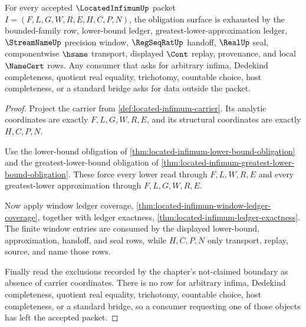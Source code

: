 \begin{theorem}
\label{thm:located-infimum-obligation-boundary}
For every accepted $\LocatedInfimumUp$ packet $I=(F,L,G,W,R,E,H,C,P,N)$, the obligation surface is exhausted by the bounded-family row, lower-bound ledger, greatest-lower-approximation ledger, $\StreamNameUp$ precision window, $\RegSeqRatUp$ handoff, $\RealUp$ seal, componentwise $\hsame$ transport, displayed $\Cont$ replay, provenance, and local $\NameCert$ rows. Any consumer that asks for arbitrary infima, Dedekind completeness, quotient real equality, trichotomy, countable choice, host completeness, or a standard bridge asks for data outside the packet.
\end{theorem}
\begin{proof}
Project the carrier from \autoref{def:located-infimum-carrier}. Its analytic coordinates are exactly $F,L,G,W,R,E$, and its structural coordinates are exactly $H,C,P,N$.

Use the lower-bound obligation of \autoref{thm:located-infimum-lower-bound-obligation} and the greatest-lower-bound obligation of \autoref{thm:located-infimum-greatest-lower-bound-obligation}. These force every lower read through $F,L,W,R,E$ and every greatest-lower approximation through $F,L,G,W,R,E$.

Now apply window ledger coverage, \autoref{thm:located-infimum-window-ledger-coverage}, together with ledger exactness, \autoref{thm:located-infimum-ledger-exactness}. The finite window entries are consumed by the displayed lower-bound, approximation, handoff, and seal rows, while $H,C,P,N$ only transport, replay, source, and name those rows.

Finally read the exclusions recorded by the chapter's not-claimed boundary as absence of carrier coordinates. There is no row for arbitrary infima, Dedekind completeness, quotient real equality, trichotomy, countable choice, host completeness, or a standard bridge, so a consumer requesting one of those objects has left the accepted packet.
\end{proof}

